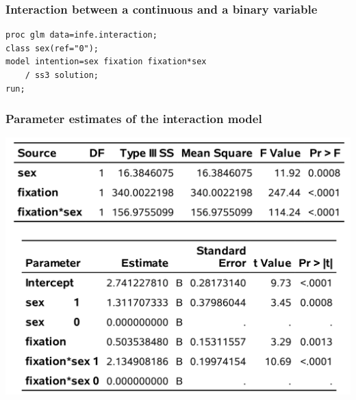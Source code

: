\documentclass{beamer}
\begin{document}
 \begin{frame}[fragile]
\frametitle{Interaction between a continuous and a binary variable}
\begin{tcolorbox}[colback=white,colframe=hecblue,title=\SASlang code to fit a linear model with an interaction]
{\small 
\begin{verbatim}
proc glm data=infe.interaction;
class sex(ref="0");
model intention=sex fixation fixation*sex 
    / ss3 solution;
run;
\end{verbatim}
}
\end{tcolorbox}
\end{frame}
\begin{frame}
\frametitle{Parameter estimates of the interaction model}
\begin{center}
  \includegraphics[width = 0.8\linewidth]{img/c2/slides3-e19}
\end{center}


 
\end{frame}
\end{document}

